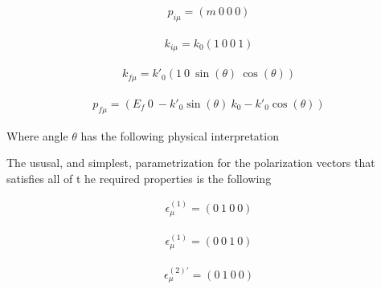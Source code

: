 \documentclass[a4]{article}
\begin{document}
    \begin{equation}
        \begin{aligned}
            p_{i \mu}  = (m \: 0 \: 0 \: 0)
        \end{aligned}
    \end{equation}

    \begin{equation}
        \begin{aligned}
            k_{i \mu}  = k_0 (1 \: 0 \: 0 \: 1)
        \end{aligned}
    \end{equation}

    \begin{equation}
        \begin{aligned}
            k_{f \mu}  = k'_0 (1 \: 0 \: \sin (\theta) \: \cos (\theta) )
        \end{aligned}
    \end{equation}

    \begin{equation}
        \begin{aligned}
            p_{f \mu}  = (E_f \: 0 \: -k'_0 \sin (\theta) \: k_0 - k'_0 \cos (\theta) )
        \end{aligned}
    \end{equation}

    Where angle $\theta$ has the following physical interpretation


    The ususal, and simplest, parametrization for the polarization vectors that satisfies all of t he required properties is the following

    \begin{equation}
        \begin{aligned}
            \epsilon_{\mu}^{(1)}  = (0 \: 1 \: 0 \: 0)
        \end{aligned}
    \end{equation}

    \begin{equation}
        \begin{aligned}
            \epsilon_{\mu}^{(1)}  = (0 \: 0 \: 1 \: 0)
        \end{aligned}
    \end{equation}

    \begin{equation}
        \begin{aligned}
            \epsilon_{\mu}^{(2)'}  = (0 \: 1 \: 0 \: 0)
        \end{aligned}
    \end{equation}
\end{document}
